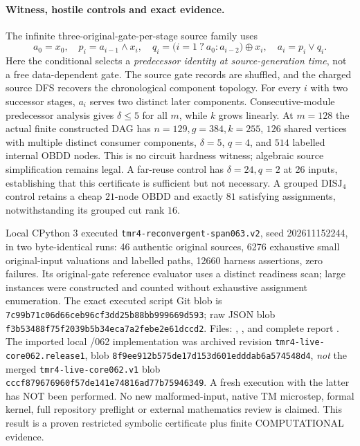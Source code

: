 \documentclass[11pt]{article}
\begin{document}
\paragraph{Witness, hostile controls and exact evidence.}
The infinite three-original-gate-per-stage source family uses
\[
 a_0=x_0,\quad p_i=a_{i-1}\wedge x_i,\quad
 q_i=\bigl(i=1\ ?\ a_0:a_{i-2}\bigr)\oplus x_i,\quad
 a_i=p_i\vee q_i .
\]
Here the conditional selects a \emph{predecessor identity at source-generation time}, not a free data-dependent gate. The source gate records are shuffled, and the charged source DFS recovers the chronological component topology. For every $i$ with two successor stages, $a_i$ serves two distinct later components. Consecutive-module predecessor analysis gives $\delta\le5$ for all $m$, while $k$ grows linearly. At $m=128$ the actual finite constructed DAG has $n=129,g=384,k=255$, $126$ shared vertices with multiple distinct consumer components, $\delta=5$, $q=4$, and $514$ labelled internal OBDD nodes. This is no circuit hardness witness; algebraic source simplification remains legal. A far-reuse control has $\delta=24,q=2$ at 26 inputs, establishing that this certificate is sufficient but not necessary. A grouped $\mathrm{DISJ}_4$ control retains a cheap $21$-node OBDD and exactly $81$ satisfying assignments, notwithstanding its grouped cut rank $16$.

Local CPython 3 executed \texttt{tmr4-reconvergent-span063.v2}, seed 202611152244, in two byte-identical runs: 46 authentic original sources, 6276 exhaustive small original-input valuations and labelled paths, 12660 harness assertions, zero failures. Its original-gate reference evaluator uses a distinct readiness scan; large instances were constructed and counted without exhaustive assignment enumeration. The exact executed script Git blob is \texttt{7c99b71c06d66ceb96cf3dd25b88bb999669d593}; raw JSON blob \texttt{f3b53488f75f2039b5b34eca7a2febe2e61dccd2}. Files: , , and complete report . The imported local /062 implementation was archived revision \texttt{tmr4-live-core062.release1}, blob \texttt{8f9ee912b575de17d153d601edddab6a574548d4}, \emph{not} the merged \texttt{tmr4-live-core062.v1} blob \texttt{cccf879676960f57de141e74816ad77b75946349}. A fresh execution with the latter has NOT been performed. No new malformed-input, native TM microstep, formal kernel, full repository preflight or external mathematics review is claimed. This result is a proven restricted symbolic certificate plus finite COMPUTATIONAL evidence.
\end{document}
